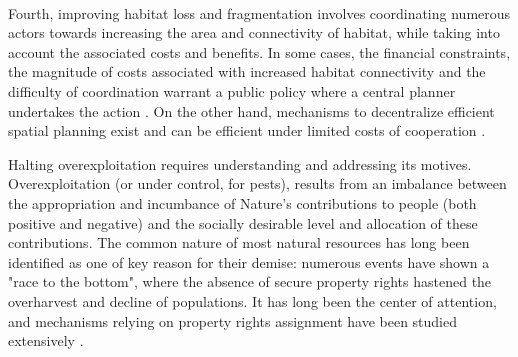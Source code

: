 \\
Fourth, improving habitat loss and fragmentation involves coordinating numerous actors towards increasing the area and connectivity of habitat, while taking into account the associated costs and benefits. In some cases, the financial constraints, the magnitude of costs associated with increased habitat connectivity and the difficulty of coordination warrant a public policy where a central planner undertakes the action \citep{Mouysset2012}. On the other hand, mechanisms to decentralize efficient spatial planning exist and can be efficient under limited costs of cooperation \citep{bareille_agglomeration_2023}.
 
	Halting overexploitation requires understanding and addressing its motives. Overexploitation (or under control, for pests), results from an imbalance between the appropriation and incumbance of Nature's contributions to people (both positive and negative) and the socially desirable level and allocation of these contributions. 	
	The common nature of most natural resources \citep{Gordon1954, smith_models_1969} has long been identified as one of key reason for their demise: numerous events have shown a "race to the bottom", where the absence of secure property rights hastened the overharvest and decline of populations. It has long been the center of attention, and mechanisms relying on property rights assignment have been studied extensively \citep{libecap_tragedy_2009,costello_partial_2015 isaksen_tragedy_2019}.\\
	

